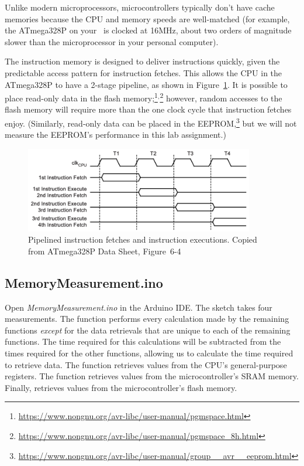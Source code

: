 Unlike modern microprocessors, microcontrollers typically don't have cache
memories because the CPU and memory speeds are well-matched (for example,
the ATmega328P on your \nano\ is clocked at 16MHz, about two orders of
magnitude slower than the microprocessor in your personal computer).

The instruction memory is designed to deliver instructions quickly, given the
predictable access pattern for instruction fetches. This allows the CPU in the
ATmega328P to have a 2-stage pipeline, as shown in Figure~\ref{fig:pipelining}.
It is possible to place read-only data in the flash
memory;\footnote{\url{https://www.nongnu.org/avr-libc/user-manual/pgmspace.html}}$^,$\footnote{\url{https://www.nongnu.org/avr-libc/user-manual/pgmspace_8h.html}}
however, random accesses to the flash memory will require more than the one
clock cycle that instruction fetches enjoy. (Similarly, read-only data can be
placed in the EEPROM,\footnote{\url{https://www.nongnu.org/avr-libc/user-manual/group__avr__eeprom.html}}
but we will not measure the EEPROM's performance in this lab assignment.)

\begin{figure}
    \centering
    \includegraphics[width=10cm]{ATmega328P_PipelineTiming}
    \caption{Pipelined instruction fetches and instruction executions. \tiny Copied from ATmega328P Data Sheet, Figure~6-4 \label{fig:pipelining}}
\end{figure}

\subsection{MemoryMeasurement.ino}

Open \textit{MemoryMeasurement.ino} in the Arduino IDE. The sketch takes four
measurements. The  function performs every
calculation made by the remaining functions \textit{except} for the data
retrievals that are unique to each of the remaining functions. The time
required for this calculations will be subtracted from the times required for
the other functions, allowing us to calculate the time required to retrieve
data. The  function retrieves values from the
CPU's general-purpose registers. The  function
retrieves values from the microcontroller's SRAM memory. Finally,
 retrieves values from the microcontroller's
flash memory.

